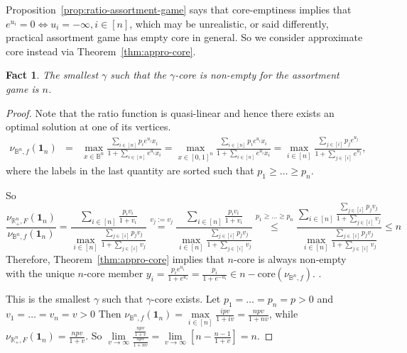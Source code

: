 \documentclass[11pt]{article}\usepackage[]{graphicx}\usepackage[]{xcolor}
\newtheorem{fact}{Fact}
\begin{document}
Proposition~\ref{prop:ratio-assortment-game} says that core-emptiness implies that $e^{u_i}=0\iff u_i=-\infty, i\in [n]$, which may be unrealistic, or said differently, practical assortment game has empty core in general. So we consider approximate core instead via Theorem~\ref{thm:appro-core}.
\begin{fact} The smallest $\gamma$ such that the $\gamma$-core is non-empty for the assortment game is $n$.
\end{fact}
\begin{proof}
Note that the ratio function is quasi-linear and hence there exists an optimal solution at one of its vertices.
\begin{eqnarray*}
\nu_{\mathbb{B}^n, f}\left(\mathbf{1}_n\right)&=&\max_{x\in\mathbb{B}^n}\frac{\sum\limits_{i\in [n]}p_ie^{u_i}x_i}{1+\sum\limits_{i\in [n]}e^{u_i}x_i}=\max_{x\in [0,1]^n}\frac{\sum\limits_{i\in [n]}p_ie^{u_i}x_i}{1+\sum\limits_{i\in [n]}e^{u_i}x_i}=\max_{i\in [n]}\frac{\sum\limits_{j\in [i]}p_je^{u_j}}{1+\sum\limits_{j\in [i]}e^{u_j}},
\end{eqnarray*}
where the labels in the last quantity are sorted such that $p_1\ge\dots\ge p_n$.

So
\[
\frac{\nu_{\mathbb{R}^n_{+}, F}\left(\mathbf{1}_n\right)}{\nu_{\mathbb{B}^n, f}\left(\mathbf{1}_n\right)}=\frac{\sum\limits_{i\in [n]}\frac{p_iv_i}{1+v_i}}{\max\limits_{i\in [n]}\frac{\sum\limits_{j\in [i]}p_jv_j}{1+\sum\limits_{j\in [i]}v_j}}\overset{v_j:=v_j}{=}\frac{\sum\limits_{i\in [n]}\frac{p_iv_i}{1+v_i}}{\max\limits_{i\in [n]}\frac{\sum\limits_{j\in [i]}p_jv_j}{1+\sum\limits_{j\in [i]}v_j}}\overset{p_1\ge\dots\ge p_n}{\le} 
\frac{\sum\limits_{i\in [n]}\frac{\sum\limits_{j\in [i]}p_jv_j}{1+\sum\limits_{j\in [i]}v_j}}{\max\limits_{i\in [n]}\frac{\sum\limits_{j\in [i]}p_jv_j}{1+\sum\limits_{j\in [i]}v_j}}
\le n
\]
Therefore, Theorem~\ref{thm:appro-core} implies that $n$-core is always non-empty with the unique $n$-core member $y_i=\frac{p_ie^{u_i}}{1+e^{u_i}}=\frac{p_i}{1+e^{-u_i}}\in n-\text{core}(\nu_{\mathbb{B}^n, f})$. . 


This is the smallest $\gamma$ such that $\gamma$-core exists. Let $p_1=\dots=p_n=p>0$ and $v_1=\dots=v_n=v>0$ Then $\nu_{\mathbb{B}^n, f}\left(\mathbf{1}_n\right)=\max\limits_{i\in [n]}\frac{ipv}{1+iv}=\frac{npv}{1+nv}$, while $\nu_{\mathbb{R}^n_{+}, F}\left(\mathbf{1}_n\right)=\frac{npv}{1+v}$. So $\lim\limits_{v\to\infty} \frac{\frac{npv}{1+v}}{\frac{npv}{1+nv}}=\lim\limits_{v\to\infty} \left[n-\frac{n-1}{1+v}\right]=n$. 
\end{proof}
\end{document}
